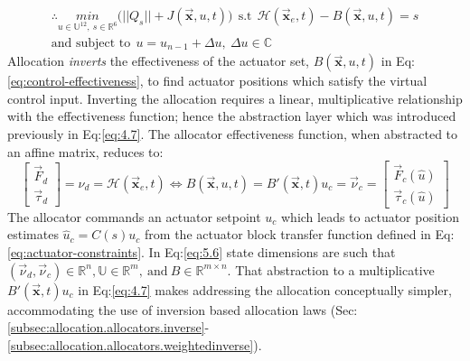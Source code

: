 \begin{multline}
\therefore\underset{u\in\mathbb{U}^{12},~s\in\mathbb{R}^6}{min}\big(||Q_s||+J(\vec{\mathbf{x}},u,t)\big)~~\text{s.t}~~\mathcal{H}(\vec{\mathbf{x}}_e,t)-B(\vec{\mathbf{x}},u,t)=s\\\text{and subject to}~~u=u_{n-1}+\Delta u,~\Delta u\in\mathbb{C}
\end{multline}
Allocation \emph{inverts} the effectiveness of the actuator set, $B(\vec{\mathbf{x}},u,t)$ in Eq:\ref{eq:control-effectiveness}, to find actuator positions which satisfy the virtual control input. Inverting the allocation requires a linear, multiplicative relationship with the effectiveness function; hence the abstraction layer which was introduced previously in Eq:\ref{eq:4.7}. The allocator effectiveness function, when abstracted to an affine matrix, reduces to:
\begin{equation}\label{eq:5.6}
\begin{bmatrix}
\vec{F}_d\\
\vec{\tau}_d
\end{bmatrix}={\nu}_d=\mathcal{H}(\vec{\mathbf{x}}_e,t)\Longleftrightarrow B(\vec{\mathbf{x}},u,t)=B'(\vec{\mathbf{x}},t)u_c=\vec{\nu}_c=\begin{bmatrix}
\vec{F}_c(\hat{u})\\
\vec{\tau}_c(\hat{u})
\end{bmatrix}
\end{equation}
The allocator commands an actuator setpoint $u_c$ which leads to actuator position estimates $\hat{u}_c=C(s)u_c$ from the actuator block transfer function defined in Eq:\ref{eq:actuator-constraints}. In Eq:\ref{eq:5.6} state dimensions are such that $(\vec{\nu}_d,\vec{\nu}_c)\in\mathbb{R}^n,\mathbb{U}\in\mathbb{R}^m,~\text{and}~B\in\mathbb{R}^{m\times n}$. That abstraction to a multiplicative $B'(\vec{\mathbf{x}},t)u_c$ in Eq:\ref{eq:4.7} makes addressing the allocation conceptually simpler, accommodating the use of inversion based allocation laws (Sec:\ref{subsec:allocation.allocators.inverse}-\ref{subsec:allocation.allocators.weightedinverse}).
